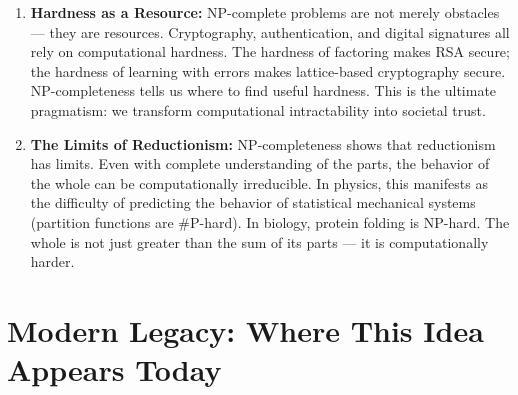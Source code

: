 \begin{enumerate}
\item \textbf{Hardness as a Resource:} NP-complete problems are not merely obstacles — they are resources. Cryptography, authentication, and digital signatures all rely on computational hardness. The hardness of factoring makes RSA secure; the hardness of learning with errors makes lattice-based cryptography secure. NP-completeness tells us where to find useful hardness. This is the ultimate pragmatism: we transform computational intractability into societal trust.

\item \textbf{The Limits of Reductionism:} NP-completeness shows that reductionism has limits. Even with complete understanding of the parts, the behavior of the whole can be computationally irreducible. In physics, this manifests as the difficulty of predicting the behavior of statistical mechanical systems (partition functions are \#P-hard). In biology, protein folding is NP-hard. The whole is not just greater than the sum of its parts — it is computationally harder.
\end{enumerate}

\section{Modern Legacy: Where This Idea Appears Today}
\label{sec:np:legacy}

